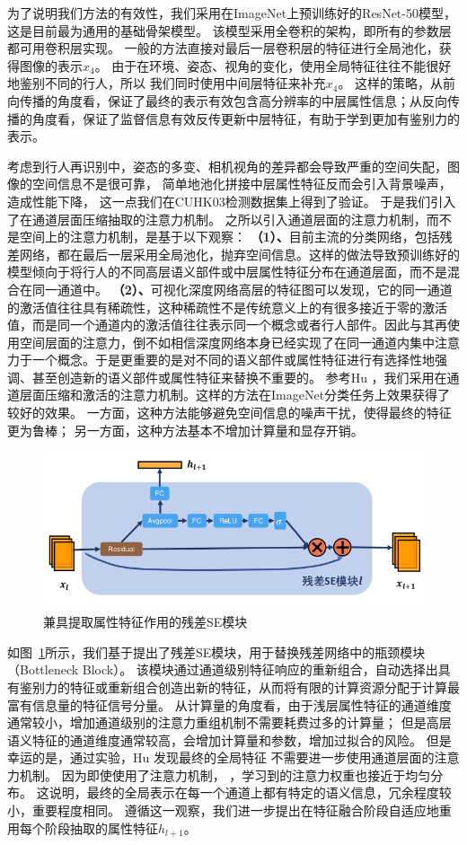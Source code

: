 为了说明我们方法的有效性，我们采用在ImageNet上预训练好的ResNet-50模型，这是目前最为通用的基础骨架模型。
该模型采用全卷积的架构，即所有的参数层都可用卷积层实现。
一般的方法直接对最后一层卷积层的特征进行全局池化，获得图像的表示$x_4$。
由于在环境、姿态、视角的变化，使用全局特征往往不能很好地鉴别不同的行人，所以
我们同时使用中间层特征来补充$x_4$。
这样的策略，从前向传播的角度看，保证了最终的表示有效包含高分辨率的中层属性信息；从反向传播的角度看，保证了监督信息有效反传更新中层特征，有助于学到更加有鉴别力的表示。

考虑到行人再识别中，姿态的多变、相机视角的差异都会导致严重的空间失配，图像的空间信息不是很可靠，
简单地池化拼接中层属性特征反而会引入背景噪声，造成性能下降，
这一点我们在CUHK03检测数据集上得到了验证。
于是我们引入了在通道层面压缩抽取的注意力机制。
之所以引入通道层面的注意力机制，而不是空间上的注意力机制，是基于以下观察：
\textbf{（1）、}目前主流的分类网络，包括残差网络，都在最后一层采用全局池化，抛弃空间信息。这样的做法导致预训练好的模型倾向于将行人的不同高层语义部件或中层属性特征分布在通道层面，而不是混合在同一通道中。
\textbf{（2）、}可视化深度网络高层的特征图可以发现，它的同一通道的激活值往往具有稀疏性，这种稀疏性不是传统意义上的有很多接近于零的激活值，而是同一个通道内的激活值往往表示同一个概念或者行人部件。因此与其再使用空间层面的注意力，倒不如相信深度网络本身已经实现了在同一通道内集中注意力于一个概念。于是更重要的是对不同的语义部件或属性特征进行有选择性地强调、甚至创造新的语义部件或属性特征来替换不重要的。
参考Hu \etal \cite{hu2017senet}，我们采用在通道层面压缩和激活的注意力机制。这样的方法在ImageNet分类任务上效果获得了较好的效果。
一方面，这种方法能够避免空间信息的噪声干扰，使得最终的特征更为鲁棒；
另一方面，这种方法基本不增加计算量和显存开销。

\begin{figure}
	\centering
	\includegraphics[width=.9\textwidth]{fig/2018-05-11-16-53-10.png}
	\caption{兼具提取属性特征作用的残差SE模块}
	\label{fig:resse}
\end{figure}

如图~\ref{fig:resse}所示，我们基于\cite{hu2017senet}提出了残差SE模块，用于替换残差网络中的瓶颈模块（Bottleneck Block）。
该模块通过通道级别特征响应的重新组合，自动选择出具有鉴别力的特征或重新组合创造出新的特征，从而将有限的计算资源分配于计算最富有信息量的特征信号分量。
从计算量的角度看，由于浅层属性特征的通道维度通常较小，增加通道级别的注意力重组机制不需要耗费过多的计算量；
但是高层语义特征的通道维度通常较高，会增加计算量和参数，增加过拟合的风险。
但是幸运的是，通过实验，Hu \etal 发现最终的全局特征
不需要进一步使用通道层面的注意力机制。
因为即使使用了注意力机制，
，学习到的注意力权重也接近于均匀分布。
这说明，最终的全局表示在每一个通道上都有特定的语义信息，冗余程度较小，重要程度相同。
遵循这一观察，我们进一步提出在特征融合阶段自适应地重用每个阶段抽取的属性特征$h_{l+1}$。

